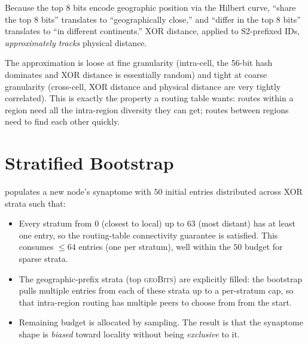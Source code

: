 \documentclass[twoside,nobib]{tufte-book}
\begin{document}
Because the top 8 bits encode geographic position via the
Hilbert curve, ``share the top 8 bits'' translates to ``geographically
close,'' and ``differ in the top 8 bits'' translates to ``in
different continents.'' XOR distance, applied to S2-prefixed IDs,
\emph{approximately tracks} physical distance.

The approximation is loose at fine granularity (intra-cell, the
56-bit hash dominates and XOR distance is essentially random)
and tight at coarse granularity (cross-cell, XOR distance and
physical distance are very tightly correlated). This is exactly
the property a routing table wants: routes within a region need
all the intra-region diversity they can get; routes between
regions need to find each other quickly.

\section{Stratified Bootstrap}

populates a new node's synaptome with $50$ initial entries
distributed across XOR strata such that:

\begin{itemize}\setlength\itemsep{0.15em}
  \item Every stratum from $0$ (closest to local) up to $63$
    (most distant) has at least one entry, so the routing-table
    connectivity guarantee is satisfied. This consumes $\le 64$
    entries (one per stratum), well within the $50$ budget for
    sparse strata.
  \item The geographic-prefix strata (top \textsc{geoBits}) are
    explicitly filled: the bootstrap pulls multiple entries from
    each of these strata up to a per-stratum cap, so that
    intra-region routing has multiple peers to choose from from
    the start.
  \item Remaining budget is allocated by sampling. The result is
    that the synaptome shape is \emph{biased} toward locality
    without being \emph{exclusive} to it.
\end{itemize}
\end{document}
